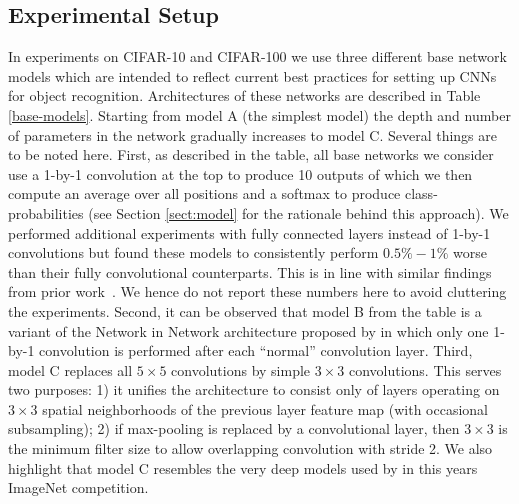 \documentclass{article} \usepackage{iclr2015,times}
\begin{document}
\subsection{Experimental Setup}
\label{sect:setup}
In experiments on CIFAR-10 and CIFAR-100 we use three different base network models which are intended to
reflect current best practices for setting up CNNs for object
recognition. 
Architectures of these networks are described in Table
\ref{base-models}. Starting from model A (the simplest model) the depth and
number of parameters in the network gradually increases to model C. 
Several things are to be noted here. First, as described in the table,
all base networks we consider use a 1-by-1 convolution at the top to
produce 10 outputs of which we then compute an average over all
positions and a softmax to produce class-probabilities (see Section
\ref{sect:model} for the rationale behind this approach). We performed
additional experiments with fully connected layers instead of 
1-by-1 convolutions but found these models to consistently perform
$ 0.5 \% - 1 \%$ worse than their fully convolutional counterparts. This
is in line with similar findings from prior work~\citep{Lin_2014}. We
hence do not report these numbers here to avoid cluttering the
experiments. Second, it can be observed that model B from the table is
a variant of the Network in Network architecture proposed by \citet{Lin_2014} in which only one 1-by-1 convolution is
performed after each ``normal'' convolution layer. Third, model C
replaces all $5 \times 5$ convolutions by simple $3 \times 3$
convolutions. This serves two purposes: 1) it unifies the
architecture to consist only of layers operating on $3 \times 3$ spatial
neighborhoods of the previous layer feature map (with occasional
subsampling); 2) if max-pooling is replaced by a
convolutional layer, then $3 \times 3$ is the minimum filter size to allow overlapping convolution with stride 2. 
We also highlight that model C resembles the very deep
models used by \citet{VGG_2014} in this years ImageNet
competition.
\end{document}
